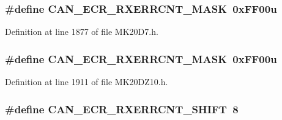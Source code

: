 \subsubsection[{\texorpdfstring{C\+A\+N\+\_\+\+E\+C\+R\+\_\+\+R\+X\+E\+R\+R\+C\+N\+T\+\_\+\+M\+A\+SK}{CAN_ECR_RXERRCNT_MASK}}]{\setlength{\rightskip}{0pt plus 5cm}\#define C\+A\+N\+\_\+\+E\+C\+R\+\_\+\+R\+X\+E\+R\+R\+C\+N\+T\+\_\+\+M\+A\+SK~0x\+F\+F00u}\hypertarget{group___c_a_n___register___masks_gaed0f3cf7cea69b12a5166e67ad58b98e}{}\label{group___c_a_n___register___masks_gaed0f3cf7cea69b12a5166e67ad58b98e}


Definition at line 1877 of file M\+K20\+D7.\+h.

\subsubsection[{\texorpdfstring{C\+A\+N\+\_\+\+E\+C\+R\+\_\+\+R\+X\+E\+R\+R\+C\+N\+T\+\_\+\+M\+A\+SK}{CAN_ECR_RXERRCNT_MASK}}]{\setlength{\rightskip}{0pt plus 5cm}\#define C\+A\+N\+\_\+\+E\+C\+R\+\_\+\+R\+X\+E\+R\+R\+C\+N\+T\+\_\+\+M\+A\+SK~0x\+F\+F00u}\hypertarget{group___c_a_n___register___masks_gaed0f3cf7cea69b12a5166e67ad58b98e}{}\label{group___c_a_n___register___masks_gaed0f3cf7cea69b12a5166e67ad58b98e}


Definition at line 1911 of file M\+K20\+D\+Z10.\+h.

\subsubsection[{\texorpdfstring{C\+A\+N\+\_\+\+E\+C\+R\+\_\+\+R\+X\+E\+R\+R\+C\+N\+T\+\_\+\+S\+H\+I\+FT}{CAN_ECR_RXERRCNT_SHIFT}}]{\setlength{\rightskip}{0pt plus 5cm}\#define C\+A\+N\+\_\+\+E\+C\+R\+\_\+\+R\+X\+E\+R\+R\+C\+N\+T\+\_\+\+S\+H\+I\+FT~8}\hypertarget{group___c_a_n___register___masks_ga8211d5f10448105a549f3f4085813922}{}\label{group___c_a_n___register___masks_ga8211d5f10448105a549f3f4085813922}


